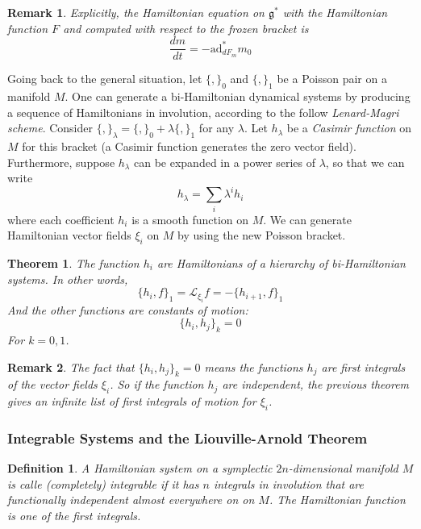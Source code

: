 \documentclass{article}
\newtheorem{thm}{Theorem}
\newtheorem{defn}{Definition}
\newtheorem{rmk}{Remark}
\begin{document}
\begin{rmk}

Explicitly, the Hamiltonian equation on $ \mathfrak{g}^*$ with the Hamiltonian function $F$ and computed with respect to the frozen bracket is 
\[
	\frac{dm}{dt}=- \mathrm{ad}^*_{dF_m} m_0
\]


\end{rmk}

\indent Going back to the general situation, let $ \{ , \}_0$ and $ \{ , \}_1$ be a Poisson pair on a manifold $M$. One can generate a bi-Hamiltonian dynamical systems by producing a sequence of Hamiltonians in involution, according to the follow \textit{Lenard-Magri scheme}. Consider $ \{ , \}_{\lambda} = \{ , \}_0 + \lambda \{ , \}_1$ for any $\lambda$. Let $h_{\lambda}$ be a \textit{Casimir function} on $M$ for this bracket (a Casimir function generates the zero vector field). Furthermore, suppose $h_{\lambda}$ can be expanded in a power series of $ \lambda$, so that we can write
\[
	h_{\lambda} = \sum_i \lambda^i h_i
\]
where each coefficient $h_i$ is a smooth function on $M$. We can generate Hamiltonian vector fields $\xi_i$ on $M$ by using the new Poisson bracket.



\begin{thm}

The function $h_i$ are Hamiltonians of a hierarchy of bi-Hamiltonian systems. In other words,
\[
	\{ h_i, f \}_1 = \mathcal{L}_{\xi_i} f = - \{ h_{i+1}, f \}_1
\]
And the other functions are constants of motion:
\[
\{ h_i, h_j \}_k = 0
\]
For $k=0,1$.

\end{thm}


\begin{rmk}

	The fact that $ \{ h_i, h_j \}_k =0$ means the functions $h_j$ are first integrals of the vector fields $\xi_i$. So if the function $h_j$ are independent, the previous theorem gives an infinite list of first integrals of motion for $\xi_i$.

\end{rmk}

\subsubsection{Integrable Systems and the Liouville-Arnold Theorem}

\begin{defn}

	A Hamiltonian system on a symplectic $2n$-dimensional manifold $M$ is calle \textit{(completely) integrable} if it has $n$ integrals in involution that are functionally independent almost everywhere on on $M$. The Hamiltonian function is one of the first integrals.

\end{defn}
\end{document}
